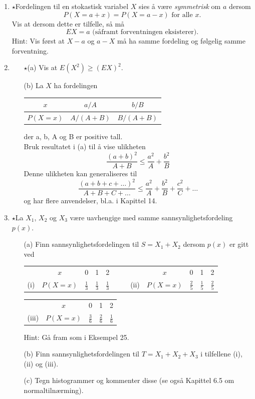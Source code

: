 \begin{enumerate}
\item $\star$Fordelingen til en stokastisk variabel $X$ sies å være
     {\em symmetrisk} om $a$ dersom
 \[    P(X=a+x)=P(X=a-x) \mbox{ for alle $x$.} \]
     Vis at dersom dette er tilfelle, så må
 \[     EX=a  \mbox{\ \ \ (såframt forventningen eksisterer).}\]
     Hint: Vis først at $X-a$ og $a-X$ må ha samme fordeling og
     følgelig samme forventning.

\item 
    \begin{itemize}
    \item[$\star$(a)]  Vis at $E(X^2)\geq (EX)^2$.
    \item[(b)]  La $X$ ha fordelingen
     \begin{center}
     \begin{tabular}{c|cc}
      $x$&$a/A$ &$b/B$  \\ \hline
      $P(X=x)$&$A/(A+B)$ &$B/(A+B)$
     \end{tabular}
     \end{center}
      der a, b, A og B er positive tall. \\
      Bruk resultatet i (a) til å vise ulikheten
      \[  \frac{{(a+b)}^2}{A+B} \leq \frac{a^2}{A}+ \frac{b^2}{B} \]
      Denne ulikheten kan generaliseres til
      \[  \frac{{(a+b+c+ \ldots)}^2}{A+B+C+ \ldots} \leq 
                \frac{a^2}{A}+ \frac{b^2}{B} + \frac{c^2}{C}+ \ldots \]
      og har flere anvendelser, bl.a. i Kapittel 14.
     \end{itemize}

\item $\star$La $X_1$, $X_2$ og $X_3$ være uavhengige med samme
     sannsynlighetsfordeling $p(x)$.
    \begin{itemize}
    \item[(a)]  Finn sannsynlighetsfordelingen til $S=X_1+X_2$ dersom
          $p(x)$ er gitt ved
    \begin{center}
    \begin{tabular}{cc|ccccccc|ccc}
        & $x$& 0 & 1 & 2 & & & &$x$& 0 & 1 & 2\\ \cline{2-5} \cline{9-12}
     (i)&$P(X=x)$&$\frac{1}{3}$&$\frac{1}{3}$&$\frac{1}{3}$& & &
    (ii)&$P(X=x)$&$\frac{2}{5}$&$\frac{1}{5}$&$\frac{2}{5}$
   \end{tabular}
    \begin{tabular}{cc|ccc}
        & $x$& 0 & 1 & 2 \\ \cline{2-5}
     (iii)&$P(X=x)$&$\frac{3}{6}$&$\frac{2}{6}$&$\frac{1}{6}$
   \end{tabular}           
   \end{center}
          Hint: Gå fram som i Eksempel 25.
    \item[(b)]  Finn sannsynlighetsfordelingen til $T=X_1+X_2+X_3$ i
       tilfellene (i), (ii) og (iii).
    \item[(c)]  Tegn histogrammer og kommenter disse (se også Kapittel
          6.5 om normaltilnærming).
     \end{itemize}


\end{enumerate}
